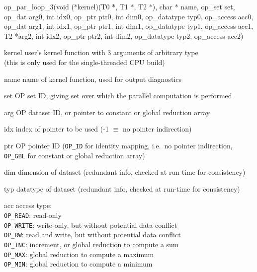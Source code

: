 \begin{routine} {op\_par\_loop\_3(void (*kernel)(T0 *, T1 *, T2 *), char * name, op\_set set,\\
\hspace*{0.13in}    op\_dat arg0, int idx0, op\_ptr ptr0, int dim0, op\_datatype typ0, op\_access acc0,\\
\hspace*{0.13in}    op\_dat arg1, int idx1, op\_ptr ptr1, int dim1, op\_datatype typ1, op\_access acc1,\\
\hspace*{0.13in}    T2     *arg2, int idx2, op\_ptr ptr2, int dim2, op\_datatype typ2, op\_access acc2)}{}

\item[kernel]     user's kernel function with 3 arguments of arbitrary type\\
                  (this is only used for the single-threaded CPU build)
\item[name]       name of kernel function, used for output diagnostics
\item[set]        OP set ID, giving set over which the parallel computation is performed
\item[arg]        OP dataset ID, or pointer to constant or global reduction array
\item[idx]        index of pointer to be used (-1 $\equiv$ no pointer indirection)
\item[ptr]        OP pointer ID ({\tt OP\_ID} for identity mapping, i.e.~no pointer indirection,
                  {\tt OP\_GBL} for constant or global reduction array)
\item[dim]        dimension of dataset (redundant info, checked at run-time for consistency)
\item[typ]        datatype of dataset (redundant info, checked at run-time for consistency)
\item[acc]        access type:\\
                  {\tt OP\_READ}: read-only\\ 
                  {\tt OP\_WRITE}: write-only, but without potential data conflict\\ 
                  {\tt OP\_RW}:  read and write, but without potential data conflict\\
                  {\tt OP\_INC}: increment, or global reduction to compute a sum\\ 
                  {\tt OP\_MAX}: global reduction to compute a maximum \\ 
                  {\tt OP\_MIN}: global reduction to compute a minimum \\ 
\end{routine}

